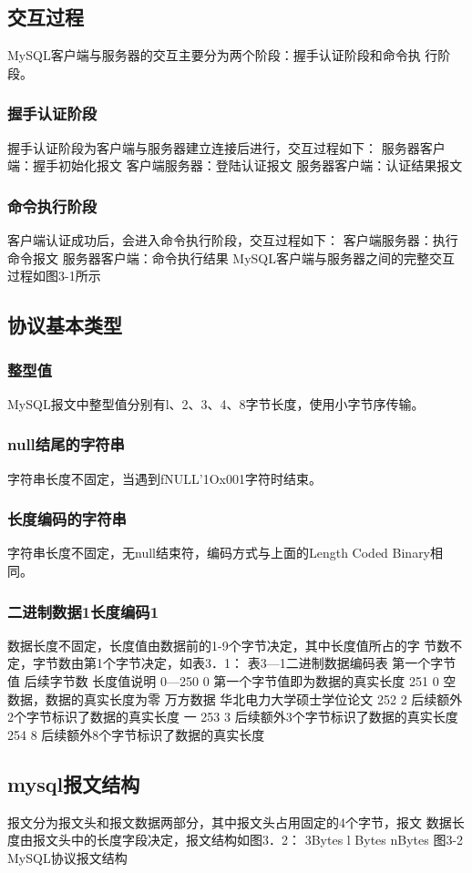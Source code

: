 \subsection{交互过程}
MySQL客户端与服务器的交互主要分为两个阶段：握手认证阶段和命令执
行阶段。
\subsubsection*{握手认证阶段}
握手认证阶段为客户端与服务器建立连接后进行，交互过程如下：
服务器客户端：握手初始化报文
客户端服务器：登陆认证报文
服务器客户端：认证结果报文
\subsubsection*{命令执行阶段}
客户端认证成功后，会进入命令执行阶段，交互过程如下：
客户端服务器：执行命令报文
服务器客户端：命令执行结果
MySQL客户端与服务器之间的完整交互过程如图3-1所示

\subsection{协议基本类型}
\subsubsection*{整型值}
MySQL报文中整型值分别有l、2、3、4、8字节长度，使用小字节序传输。
\subsubsection*{null结尾的字符串}
字符串长度不固定，当遇到fNULL’1Ox001字符时结束。
\subsubsection*{长度编码的字符串}
字符串长度不固定，无null结束符，编码方式与上面的Length
Coded Binary相同。
\subsubsection*{二进制数据1长度编码1}
数据长度不固定，长度值由数据前的1-9个字节决定，其中长度值所占的字
节数不定，字节数由第1个字节决定，如表3．1：
表3—1二进制数据编码表
第一个字节值
后续字节数 长度值说明
0—250 0
第一个字节值即为数据的真实长度
251 0
空数据，数据的真实长度为零
万方数据
华北电力大学硕士学位论文
252 2
后续额外2个字节标识了数据的真实长度 一
253 3 后续额外3个字节标识了数据的真实长度
254 8 后续额外8个字节标识了数据的真实长度
\subsection{mysql报文结构}
报文分为报文头和报文数据两部分，其中报文头占用固定的4个字节，报文
数据长度由报文头中的长度字段决定，报文结构如图3．2：
3Bytes
l Bytes nBytes
图3-2 MySQL协议报文结构
